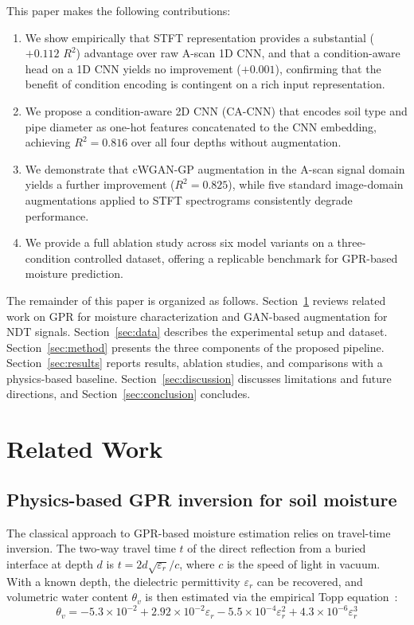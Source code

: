 \documentclass[review]{elsarticle}
\begin{document}
This paper makes the following contributions:
\begin{enumerate}
    \item We show empirically that STFT representation provides a substantial ($+0.112$ $R^2$) advantage over raw A-scan 1D CNN, and that a condition-aware head on a 1D CNN yields no improvement ($+0.001$), confirming that the benefit of condition encoding is contingent on a rich input representation.
    \item We propose a condition-aware 2D CNN (CA-CNN) that encodes soil type and pipe diameter as one-hot features concatenated to the CNN embedding, achieving $R^2 = 0.816$ over all four depths without augmentation.
    \item We demonstrate that cWGAN-GP augmentation in the A-scan signal domain yields a further improvement ($R^2 = 0.825$), while five standard image-domain augmentations applied to STFT spectrograms consistently degrade performance.
    \item We provide a full ablation study across six model variants on a three-condition controlled dataset, offering a replicable benchmark for GPR-based moisture prediction.
\end{enumerate}

The remainder of this paper is organized as follows. Section~\ref{sec:related} reviews related work on GPR for moisture characterization and GAN-based augmentation for NDT signals. Section~\ref{sec:data} describes the experimental setup and dataset. Section~\ref{sec:method} presents the three components of the proposed pipeline. Section~\ref{sec:results} reports results, ablation studies, and comparisons with a physics-based baseline. Section~\ref{sec:discussion} discusses limitations and future directions, and Section~\ref{sec:conclusion} concludes.


\section{Related Work}
\label{sec:related}

\subsection{Physics-based GPR inversion for soil moisture}

The classical approach to GPR-based moisture estimation relies on travel-time inversion. The two-way travel time $t$ of the direct reflection from a buried interface at depth $d$ is $t = 2d\sqrt{\varepsilon_r}/c$, where $c$ is the speed of light in vacuum. With a known depth, the dielectric permittivity $\varepsilon_r$ can be recovered, and volumetric water content $\theta_v$ is then estimated via the empirical Topp equation~\cite{Topp1980}:
\begin{equation}
    \theta_v = -5.3 \times 10^{-2} + 2.92 \times 10^{-2}\varepsilon_r - 5.5 \times 10^{-4}\varepsilon_r^2 + 4.3 \times 10^{-6}\varepsilon_r^3
\end{equation}
\end{document}
